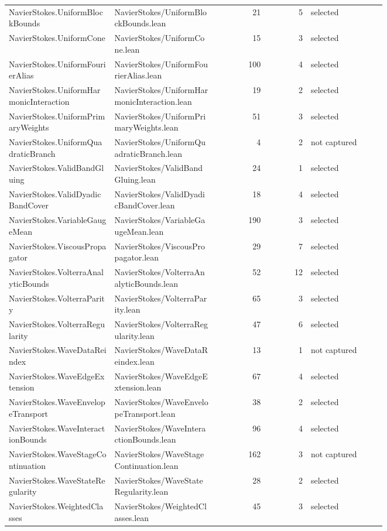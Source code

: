 \documentclass[10pt]{article}
\begin{document}
\begin{longtable}{p{0.28\linewidth}p{0.27\linewidth}r r p{0.20\linewidth}}
NavierStokes.UniformBlockBounds & NavierStokes/UniformBlockBounds.lean & 21 & 5 & selected\\
NavierStokes.UniformCone & NavierStokes/UniformCone.lean & 15 & 3 & selected\\
NavierStokes.UniformFourierAlias & NavierStokes/UniformFourierAlias.lean & 100 & 4 & selected\\
NavierStokes.UniformHarmonicInteraction & NavierStokes/UniformHarmonicInteraction.lean & 19 & 2 & selected\\
NavierStokes.UniformPrimaryWeights & NavierStokes/UniformPrimaryWeights.lean & 51 & 3 & selected\\
NavierStokes.UniformQuadraticBranch & NavierStokes/UniformQuadraticBranch.lean & 4 & 2 & not captured\\
NavierStokes.ValidBandGluing & NavierStokes/ValidBandGluing.lean & 24 & 1 & selected\\
NavierStokes.ValidDyadicBandCover & NavierStokes/ValidDyadicBandCover.lean & 18 & 4 & selected\\
NavierStokes.VariableGaugeMean & NavierStokes/VariableGaugeMean.lean & 190 & 3 & selected\\
NavierStokes.ViscousPropagator & NavierStokes/ViscousPropagator.lean & 29 & 7 & selected\\
NavierStokes.VolterraAnalyticBounds & NavierStokes/VolterraAnalyticBounds.lean & 52 & 12 & selected\\
NavierStokes.VolterraParity & NavierStokes/VolterraParity.lean & 65 & 3 & selected\\
NavierStokes.VolterraRegularity & NavierStokes/VolterraRegularity.lean & 47 & 6 & selected\\
NavierStokes.WaveDataReindex & NavierStokes/WaveDataReindex.lean & 13 & 1 & not captured\\
NavierStokes.WaveEdgeExtension & NavierStokes/WaveEdgeExtension.lean & 67 & 4 & selected\\
NavierStokes.WaveEnvelopeTransport & NavierStokes/WaveEnvelopeTransport.lean & 38 & 2 & selected\\
NavierStokes.WaveInteractionBounds & NavierStokes/WaveInteractionBounds.lean & 96 & 4 & selected\\
NavierStokes.WaveStageContinuation & NavierStokes/WaveStageContinuation.lean & 162 & 3 & not captured\\
NavierStokes.WaveStateRegularity & NavierStokes/WaveStateRegularity.lean & 28 & 2 & selected\\
NavierStokes.WeightedClasses & NavierStokes/WeightedClasses.lean & 45 & 3 & selected\\

\end{longtable}
\end{document}
